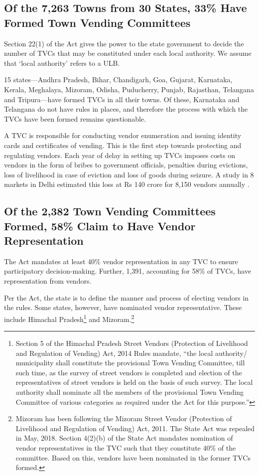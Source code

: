 \documentclass[a4paper, 12pt, twoside]{article}
\begin{document}
{\subsection*{Of the 7,263 Towns from 30 States, 33\% Have Formed Town Vending Committees}
	Section 22(1) of the Act gives the power to the state government to decide the number of TVCs that may be  constituted under each local authority. We assume that ‘local authority’ refers to a ULB.

	15 states—Andhra Pradesh, Bihar, Chandigarh, Goa, Gujarat, Karnataka, Kerala, Meghalaya, Mizoram, Odisha, Puducherry, Punjab, Rajasthan, Telangana and Tripura—have formed TVCs in all their towns. Of these, Karnataka and Telangana do not have rules in places, and therefore the process with which the TVCs have been formed remains questionable.

	A TVC is responsible for conducting vendor enumeration and issuing identity cards and certificates of vending. This is the first step towards protecting and regulating vendors. Each year of delay in setting up TVCs imposes costs on vendors in the form of bribes to government officials, penalties during evictions, loss of livelihood in case of eviction and loss of goods during seizure. A study in 8 markets in Delhi estimated this loss at Rs 140 crore for 8,150 vendors annually \parencite{ratanpaper}.

\subsection*{Of the 2,382 Town Vending Committees Formed, 58\% Claim to Have Vendor Representation}
	The Act mandates at least 40\% vendor representation in any TVC to ensure participatory decision-making. Further, 1,391, accounting for 58\% of TVCs, have representation from vendors.

	Per the Act, the state is to define the manner and process of electing vendors in the rules. Some states, however, have nominated vendor representative. These include Himachal Pradesh\footnote{Section 5 of the Himachal Pradesh Street Vendors (Protection of Livelihood and Regulation of Vending) Act, 2014 Rules mandate, “the local authority/ municipality shall constitute the provisional Town Vending Committee, till such time, as the survey of street vendors is completed and election of the representatives of street vendors is held on the basis of such survey. The local authority shall nominate all the members of the provisional Town Vending Committee of various categories as required under the Act for this purpose.”} and Mizoram.\footnote{Mizoram has been following the Mizoram Street Vendor (Protection of Livelihood and Regulation of Vending) Act, 2011. The State Act was repealed in May, 2018. Section 4(2)(b) of the State Act mandates nomination of vendor representatives in the TVC such that they constitute 40\% of the committee. Based on this, vendors have been nominated in the former TVCs formed.}

}
\end{document}
